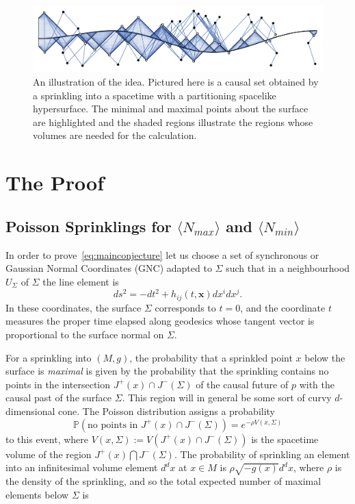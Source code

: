 \documentclass[12pt]{article}
\newcommand{\be}{\begin{equation}}
\newcommand{\ee}{\end{equation}}
\begin{document}
\begin{figure}
  \centering
    \includegraphics[width=\textwidth]{minmaxplot}
     \caption{An illustration of the idea. Pictured here is a causal set obtained by a sprinkling into a spacetime with a partitioning spacelike hypersurface. The minimal and maximal points about the surface are highlighted and the shaded regions illustrate the regions whose volumes are needed for the calculation.}
     \label{fig:Nmin_Nmax}
\end{figure}

\section{The Proof}

\subsection{Poisson Sprinklings for $\langle N_{max}\rangle$ and $\langle N_{min}\rangle$}

In order to prove~\eqref{eq:mainconjecture} let us choose a set of synchronous or Gaussian Normal Coordinates (GNC) adapted to $\Sigma$ such that in a neighbourhood $U_\Sigma$ of $\Sigma$ the line element is
\be
ds^2 = -dt^2 + h_{ij}(t,\mathbf x) dx^i dx^j.
\ee
In these coordinates, the surface $\Sigma$ corresponds to $t=0$, and the coordinate $t$ measures the proper time elapsed along geodesics whose tangent vector is proportional to the surface normal on $\Sigma$.

For a sprinkling into $(M,g)$, the probability that a sprinkled point $x$ below the surface is \emph{maximal} is given by the probability that the sprinkling contains no points in the intersection $J^{+}(x)\cap J^{-}(\Sigma)$ of the causal future of $p$ with the causal past of the surface $\Sigma$. This region will in general be some sort of curvy $d$-dimensional cone. The Poisson distribution assigns a probability
\be\label{Poisson}
\mathbb P\left(\text{no points in }J^{+}(x)\cap J^{-}(\Sigma)\right)=e^{-\rho V(x,\Sigma)}
\ee
to this event, where $V(x,\Sigma):=V(J^{+}(x)\cap J^{-}(\Sigma))$ is the spacetime volume of the region $J^{+}(x)\bigcap J^{-}(\Sigma)$. The probability of sprinkling an element into an infinitesimal volume element $d^dx$ at $x\in M$ is $\rho\sqrt{-g(x)}d^dx$, where $\rho$ is the density of the sprinkling, and so the total expected number of maximal elements below $\Sigma$ is
\end{document}
